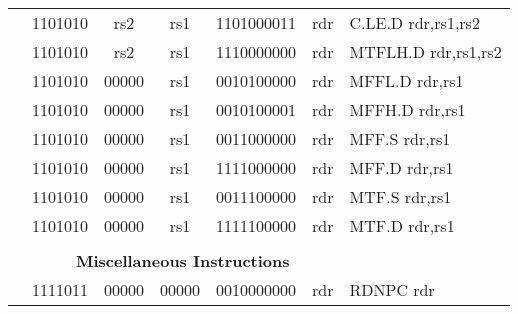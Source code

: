 \begin{table}[p]
\begin{small}
\begin{center}
\begin{tabular}{rcccccccccl}
&
\multicolumn{2}{|c|}{1101010} &
\multicolumn{1}{c|}{rs2} &
\multicolumn{1}{c|}{rs1} &
\multicolumn{4}{c|}{1101000011} &
\multicolumn{1}{c|}{rdr} & C.LE.D rdr,rs1,rs2 \\
\cline{2-10}
  

&
\multicolumn{2}{|c|}{1101010} &
\multicolumn{1}{c|}{rs2} &
\multicolumn{1}{c|}{rs1} &
\multicolumn{4}{c|}{1110000000} &
\multicolumn{1}{c|}{rdr} & MTFLH.D rdr,rs1,rs2 \\
\cline{2-10}
  

&
\multicolumn{2}{|c|}{1101010} &
\multicolumn{1}{c|}{00000} &
\multicolumn{1}{c|}{rs1} &
\multicolumn{4}{c|}{0010100000} &
\multicolumn{1}{c|}{rdr} & MFFL.D rdr,rs1 \\
\cline{2-10}
  

&
\multicolumn{2}{|c|}{1101010} &
\multicolumn{1}{c|}{00000} &
\multicolumn{1}{c|}{rs1} &
\multicolumn{4}{c|}{0010100001} &
\multicolumn{1}{c|}{rdr} & MFFH.D rdr,rs1 \\
\cline{2-10}
  

&
\multicolumn{2}{|c|}{1101010} &
\multicolumn{1}{c|}{00000} &
\multicolumn{1}{c|}{rs1} &
\multicolumn{4}{c|}{0011000000} &
\multicolumn{1}{c|}{rdr} & MFF.S rdr,rs1 \\
\cline{2-10}
  

&
\multicolumn{2}{|c|}{1101010} &
\multicolumn{1}{c|}{00000} &
\multicolumn{1}{c|}{rs1} &
\multicolumn{4}{c|}{1111000000} &
\multicolumn{1}{c|}{rdr} & MFF.D rdr,rs1 \\
\cline{2-10}
  

&
\multicolumn{2}{|c|}{1101010} &
\multicolumn{1}{c|}{00000} &
\multicolumn{1}{c|}{rs1} &
\multicolumn{4}{c|}{0011100000} &
\multicolumn{1}{c|}{rdr} & MTF.S rdr,rs1 \\
\cline{2-10}
  

&
\multicolumn{2}{|c|}{1101010} &
\multicolumn{1}{c|}{00000} &
\multicolumn{1}{c|}{rs1} &
\multicolumn{4}{c|}{1111100000} &
\multicolumn{1}{c|}{rdr} & MTF.D rdr,rs1 \\
\cline{2-10}
  

&
\multicolumn{9}{c}{} & \\
&
\multicolumn{9}{c}{\bf Miscellaneous Instructions} & \\
\cline{2-10}
  

&
\multicolumn{2}{|c|}{1111011} &
\multicolumn{1}{c|}{00000} &
\multicolumn{1}{c|}{00000} &
\multicolumn{4}{c|}{0010000000} &
\multicolumn{1}{c|}{rdr} & RDNPC rdr \\
\cline{2-10}
  


\end{tabular}
\end{center}
\end{small}
\end{table}
